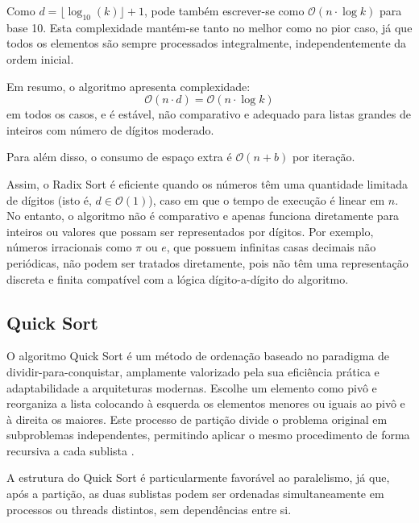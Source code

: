 \documentclass[conference]{IEEEtran}
\begin{document}
Como \( d = \lfloor \log_{10}(k) \rfloor + 1 \), pode também escrever-se como \(\mathcal{O}(n \cdot \log k)\) para base 10. Esta complexidade mantém-se tanto no melhor como no pior caso, já que todos os elementos são sempre processados integralmente, independentemente da ordem inicial.

Em resumo, o algoritmo apresenta complexidade:
\[
\mathcal{O}(n \cdot d) = \mathcal{O}(n \cdot \log k)
\]
em todos os casos, e é estável, não comparativo e adequado para listas grandes de inteiros com número de dígitos moderado.

Para além disso, o consumo de espaço extra é \(\mathcal{O}(n + b)\) por iteração.

Assim, o Radix Sort é eficiente quando os números têm uma quantidade limitada de dígitos (isto é, \( d \in \mathcal{O}(1) \)), caso em que o tempo de execução é linear em \( n \). No entanto, o algoritmo não é comparativo e apenas funciona diretamente para inteiros ou valores que possam ser representados por dígitos. Por exemplo, números irracionais como \( \pi \) ou \( e \), que possuem infinitas casas decimais não periódicas, não podem ser tratados diretamente, pois não têm uma representação discreta e finita compatível com a lógica dígito-a-dígito do algoritmo.

\subsection{Quick Sort}

O algoritmo Quick Sort é um método de ordenação baseado no paradigma de dividir-para-conquistar, amplamente valorizado pela sua eficiência prática e adaptabilidade a arquiteturas modernas. Escolhe um elemento como pivô e reorganiza a lista colocando à esquerda os elementos menores ou iguais ao pivô e à direita os maiores. Este processo de partição divide o problema original em subproblemas independentes, permitindo aplicar o mesmo procedimento de forma recursiva a cada sublista \cite{quicksort}.

A estrutura do Quick Sort é particularmente favorável ao paralelismo, já que, após a partição, as duas sublistas podem ser ordenadas simultaneamente em processos ou threads distintos, sem dependências entre si.
\end{document}
